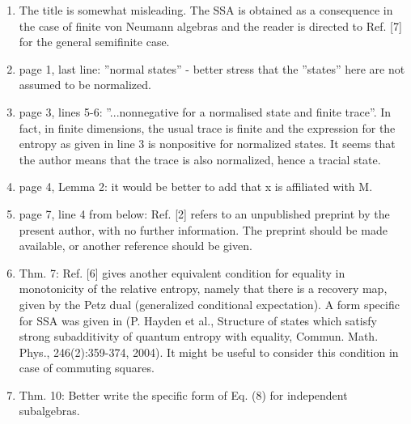 \documentclass[12pt]{article}
\begin{document}
\begin{enumerate}
\item The title is somewhat misleading. The SSA is obtained as a consequence in the case
of finite von Neumann algebras and the reader is directed to Ref. [7] for the general semifinite
case.
\item page 1, last line: ''normal states'' - better stress that the ''states'' here are
not assumed to be normalized.

\item page 3, lines 5-6: ''...nonnegative for a normalised state and finite trace''. In
fact, in finite dimensions, the usual trace is finite and the expression for the entropy
as given in line 3 is nonpositive for normalized states. It seems that the author means
that the trace is also normalized, hence a tracial state.

\item page 4, Lemma 2: it would be better to add that  x is affiliated with M.

\item page 7, line 4 from below: Ref. [2] refers to an unpublished preprint by the present
author, with no further information. The preprint should be made available, or another
reference should be given.

\item Thm. 7: Ref. [6] gives another equivalent condition for equality in monotonicity of
the relative entropy, namely that there is a recovery map, given by the Petz dual
(generalized conditional expectation). A form specific for SSA was given in 
(P. Hayden et al., Structure of states which satisfy strong subadditivity of quantum
entropy with equality, Commun. Math. Phys., 246(2):359-374, 2004). 
It might be useful to consider this condition in case of commuting squares.

\item Thm. 10: Better write the specific form of Eq. (8) for independent subalgebras.


\end{enumerate}
\end{document}
